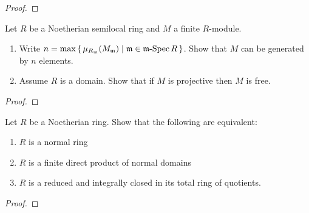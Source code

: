 \begin{proof}
\end{proof}
\newpage
\begin{problem}
Let $R$ be a Noetherian semilocal ring and $M$ a finite
$R$-module.
\begin{enumerate}[label=(\alph*)]
\item Write
  $n=\max\left\{\,\mu_{R_{\mathfrak{m}}}(M_{\mathfrak{m}})\;\middle|\;\mathfrak{m}\in\operatorname{\mathfrak{m}-Spec}
  R\,\right\}$. Show that $M$ can be generated by $n$ elements.
\item Assume $R$ is a domain. Show that if $M$ is projective then
  $M$ is free.
\end{enumerate}
\end{problem}
\begin{proof}
\end{proof}
\newpage
\begin{problem}
Let $R$ be a Noetherian ring. Show that the following are
equivalent:
\begin{enumerate}[label=(\roman*)]
\item $R$ is a normal ring
\item $R$ is a finite direct product of normal domains
\item $R$ is a reduced and integrally closed in its total ring of
  quotients.
\end{enumerate}
\end{problem}
\begin{proof}
\end{proof}

